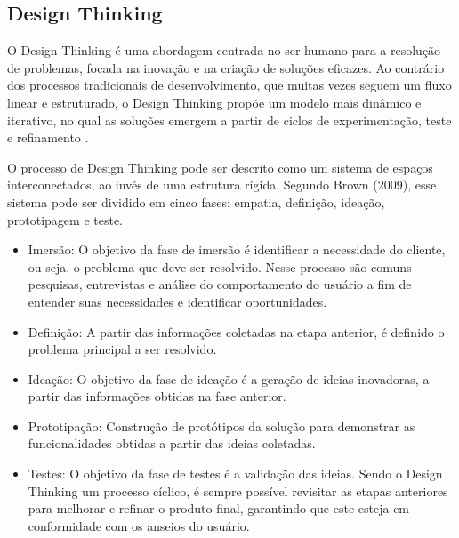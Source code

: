 \subsection{Design Thinking}
O Design Thinking é uma abordagem centrada no ser humano para a resolução de problemas, focada na inovação e na criação de soluções eficazes. Ao contrário dos processos tradicionais de desenvolvimento, que muitas vezes seguem um fluxo linear e estruturado, o Design Thinking propõe um modelo mais dinâmico e iterativo, no qual as soluções emergem a partir de ciclos de experimentação, teste e refinamento \cite{browndesignthinking}.

O processo de Design Thinking pode ser descrito como um sistema de espaços interconectados, ao invés de uma estrutura rígida. Segundo Brown (2009), esse sistema pode ser dividido em cinco fases: empatia, definição, ideação, prototipagem e teste.

\begin{itemize}
    \item Imersão: O objetivo da fase de imersão é identificar a necessidade do cliente, ou seja, o problema que deve ser resolvido. Nesse processo são comuns pesquisas, entrevistas e análise do comportamento do usuário a fim de entender suas necessidades e identificar oportunidades.
    \item Definição: A partir das informações coletadas na etapa anterior, é definido o problema principal a ser resolvido.
    \item Ideação: O objetivo da fase de ideação é a geração de ideias inovadoras, a partir das informações obtidas na fase anterior. 
    \item Prototipação: Construção de protótipos da solução para demonstrar as funcionalidades obtidas a partir das ideias coletadas.
    \item Testes: O objetivo da fase de testes é a validação das ideias. Sendo o Design Thinking um processo cíclico, é sempre possível revisitar as etapas anteriores para melhorar e refinar o produto final, garantindo que este esteja em conformidade com os anseios do usuário.
\end{itemize}


 